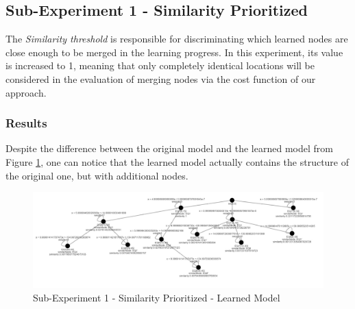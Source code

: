 \subsection{Sub-Experiment 1 - Similarity Prioritized}
The \textit{Similarity threshold} is responsible for discriminating which learned nodes are close enough to be merged in the learning progress. In this experiment, its value is increased to 1, meaning that only completely identical locations will be considered in the evaluation of merging nodes via the cost function of our approach. 

\subsubsection{Results}
Despite the difference between the original model and the learned model from Figure \ref{experiment_similarity_threshold}, one can notice that the learned model actually contains the structure of the original one, but with additional nodes. 
\begin{figure}[h]
	\centering
	\includegraphics[scale=0.4]{./pictures/similarity_experiment/learnedModel.png}
	\caption{Sub-Experiment 1 - Similarity Prioritized - Learned Model}
	\label{experiment_similarity_threshold}
\end{figure}

